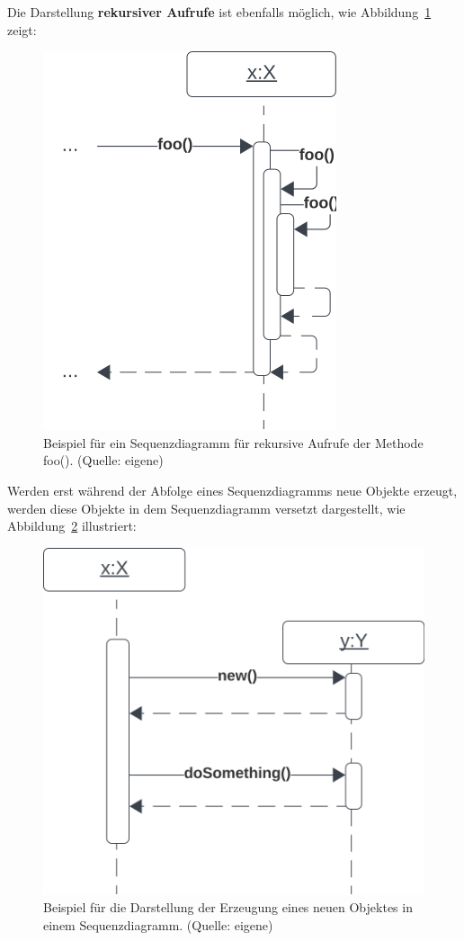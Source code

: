 \noindent
Die Darstellung \textbf{rekursiver Aufrufe} ist ebenfalls möglich, wie Abbildung~\ref{fig:recursion} zeigt:

\begin{figure}
    \centering
    \includegraphics[scale=0.5]{chapters/fopt3/img/recursion}
    \caption{Beispiel für ein Sequenzdiagramm für rekursive Aufrufe der Methode foo(). (Quelle: eigene)}
    \label{fig:recursion}
\end{figure}


\noindent
Werden erst während der Abfolge eines Sequenzdiagramms neue Objekte erzeugt, werden diese Objekte in dem Sequenzdiagramm versetzt dargestellt, wie Abbildung~\ref{fig:create} illustriert:

\begin{figure}
    \centering
    \includegraphics[scale=0.5]{chapters/fopt3/img/create}
    \caption{Beispiel für die Darstellung der Erzeugung eines neuen Objektes in einem Sequenzdiagramm. (Quelle: eigene)}
    \label{fig:create}
\end{figure}
